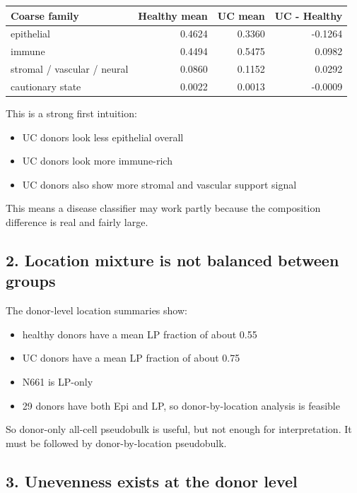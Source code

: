 \documentclass[11pt]{article}
\begin{document}
\begin{center}
\begin{tabular}{lrrr}
\toprule
\textbf{Coarse family} & \textbf{Healthy mean} & \textbf{UC mean} & \textbf{UC - Healthy} \\
\midrule
epithelial & 0.4624 & 0.3360 & -0.1264 \\
immune & 0.4494 & 0.5475 & 0.0982 \\
stromal / vascular / neural & 0.0860 & 0.1152 & 0.0292 \\
cautionary state & 0.0022 & 0.0013 & -0.0009 \\
\bottomrule
\end{tabular}
\end{center}

This is a strong first intuition:

\begin{itemize}
  \item UC donors look less epithelial overall
  \item UC donors look more immune-rich
  \item UC donors also show more stromal and vascular support signal
\end{itemize}

This means a disease classifier may work partly because the composition
difference is real and fairly large.

\subsection*{2. Location mixture is not balanced between groups}

The donor-level location summaries show:

\begin{itemize}
  \item healthy donors have a mean LP fraction of about 0.55
  \item UC donors have a mean LP fraction of about 0.75
  \item N661 is LP-only
  \item 29 donors have both Epi and LP, so donor-by-location analysis is feasible
\end{itemize}

So donor-only all-cell pseudobulk is useful, but not enough for interpretation.
It must be followed by donor-by-location pseudobulk.

\subsection*{3. Unevenness exists at the donor level}
\end{document}
